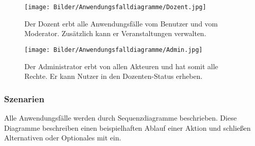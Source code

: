 \documentclass[12pt,a4paper]{article}
\begin{document}
\begin{figure}[H]
	\centering
	\texttt{[image: Bilder/Anwendungsfalldiagramme/Dozent.jpg]}
	\caption{Der Dozent erbt alle Anwendungsfälle vom Benutzer und vom Moderator. Zusätzlich kann er Veranstaltungen verwalten.}
	\label{AwfDozent}
\end{figure}

\begin{figure}[H]
	\centering
	\texttt{[image: Bilder/Anwendungsfalldiagramme/Admin.jpg]}
	\caption{Der Administrator erbt von allen Akteuren und hat somit alle Rechte. Er kann Nutzer in den Dozenten-Status erheben.}
	\label{AwfAdmin}
\end{figure}
\subsubsection{Szenarien}
Alle Anwendungsfälle werden durch Sequenzdiagramme beschrieben. Diese Diagramme beschreiben einen beispielhaften Ablauf einer Aktion und schließen Alternativen oder Optionales mit ein.
\end{document}
